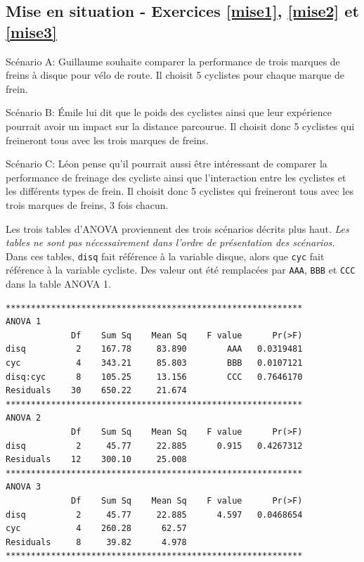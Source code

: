 \begin{questions}
\section*{Mise en situation - Exercices \ref{mise1}, \ref{mise2} et \ref{mise3}}
Scénario A: Guillaume souhaite comparer la performance de trois marques de freins à disque pour vélo de route. Il choisit 5 cyclistes pour chaque marque de frein.

\vspace{0.25cm}
Scénario B: Émile lui dit que le poids des cyclistes ainsi que leur expérience pourrait avoir un impact sur la distance parcourue. Il choisit donc 5 cyclistes qui freineront tous avec les trois marques de freins.

\vspace{0.25cm}
Scénario C: Léon pense qu'il pourrait aussi être intéressant de comparer la performance de freinage des cycliste ainsi que l'interaction entre les cyclistes et les différents types de frein. Il choisit donc 5 cyclistes qui freineront tous avec les trois marques de freins, 3 fois chacun.

\vspace{0.25cm}
Les trois tables d'ANOVA proviennent des trois scénarios décrits plus haut. \textit{Les tables ne sont pas nécessairement dans l'ordre de présentation des scénarios.} Dans ces tables, \texttt{disq} fait référence à la variable disque, alors que \texttt{cyc} fait référence à la variable cycliste. Des valeur ont été remplacées par \texttt{AAA}, \texttt{BBB} et \texttt{CCC} dans la table ANOVA 1.
\begin{verbatim}
***********************************************************
ANOVA 1
             Df    Sum Sq    Mean Sq    F value      Pr(>F)    
disq          2    167.78     83.890        AAA   0.0319481
cyc           4    343.21     85.803        BBB   0.0107121
disq:cyc      8    105.25     13.156        CCC   0.7646170
Residuals    30    650.22     21.674
***********************************************************
ANOVA 2
             Df    Sum Sq    Mean Sq    F value      Pr(>F)    
disq          2     45.77     22.885      0.915   0.4267312
Residuals    12    300.10     25.008
***********************************************************
ANOVA 3
             Df    Sum Sq    Mean Sq    F value      Pr(>F)    
disq          2     45.77     22.885      4.597   0.0468654
cyc           4    260.28      62.57   
Residuals     8     39.82      4.978
***********************************************************
\end{verbatim}


\end{questions}
